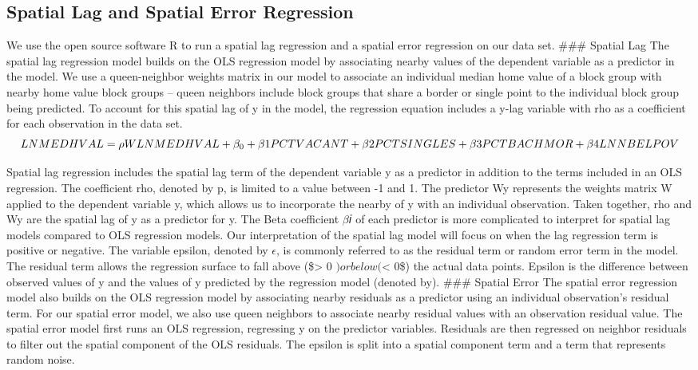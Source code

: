 \documentclass[
]{article}
\begin{document}
\hypertarget{spatial-lag-and-spatial-error-regression}{%
\subsection{Spatial Lag and Spatial Error
Regression}\label{spatial-lag-and-spatial-error-regression}}

We use the open source software R to run a spatial lag regression and a
spatial error regression on our data set. \#\#\# Spatial Lag The spatial
lag regression model builds on the OLS regression model by associating
nearby values of the dependent variable as a predictor in the model. We
use a queen-neighbor weights matrix in our model to associate an
individual median home value of a block group with nearby home value
block groups -- queen neighbors include block groups that share a border
or single point to the individual block group being predicted. To
account for this spatial lag of y in the model, the regression equation
includes a y-lag variable with rho as a coefficient for each observation
in the data set.
\[LNMEDHVAL = \rho WLNMEDHVAL + \beta_0 + \beta1 PCTVACANT + \beta2 PCTSINGLES \\ + \beta3 PCTBACHMOR + \beta4 LNNBELPOV\]

Spatial lag regression includes the spatial lag term of the dependent
variable y as a predictor in addition to the terms included in an OLS
regression. The coefficient rho, denoted by p, is limited to a value
between -1 and 1. The predictor Wy represents the weights matrix W
applied to the dependent variable y, which allows us to incorporate the
nearby of y with an individual observation. Taken together, rho and Wy
are the spatial lag of y as a predictor for y. The Beta coefficient
\(\beta\)𝑖 of each predictor is more complicated to interpret for
spatial lag models compared to OLS regression models. Our interpretation
of the spatial lag model will focus on when the lag regression term is
positive or negative. The variable epsilon, denoted by \(\epsilon\), is
commonly referred to as the residual term or random error term in the
model. The residual term allows the regression surface to fall above
(\$\epsilon \textgreater{} 0 \() or below (\)\epsilon \textless{} 0\$)
the actual data points. Epsilon is the difference between observed
values of y and the values of y predicted by the regression model
(denoted by). \#\#\# Spatial Error The spatial error regression model
also builds on the OLS regression model by associating nearby residuals
as a predictor using an individual observation's residual term. For our
spatial error model, we also use queen neighbors to associate nearby
residual values with an observation residual value. The spatial error
model first runs an OLS regression, regressing y on the predictor
variables. Residuals are then regressed on neighbor residuals to filter
out the spatial component of the OLS residuals. The epsilon is split
into a spatial component term and a term that represents random noise.
\end{document}
